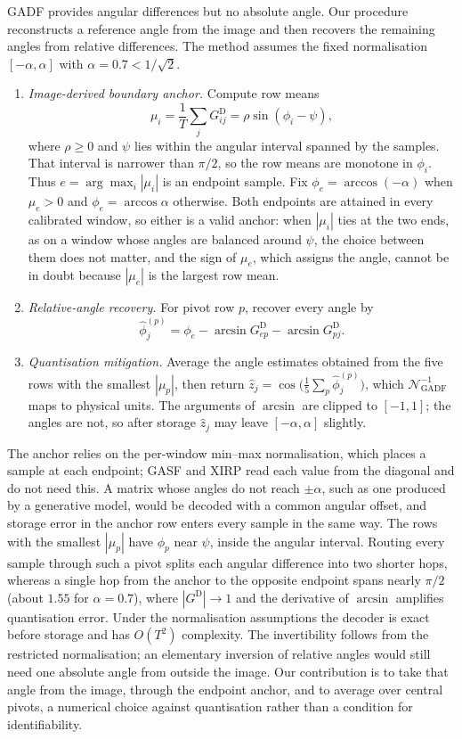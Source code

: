 \documentclass[preprint,review,12pt]{elsarticle}
\begin{document}
GADF provides angular differences but no absolute angle. Our procedure reconstructs a reference angle from the image and then recovers the remaining angles from relative differences. The method assumes the fixed normalisation $[-\alpha,\alpha]$ with $\alpha=0.7<1/\sqrt2$.
\begin{enumerate}
\item \emph{Image-derived boundary anchor.} Compute row means
\[
\mu_i=\frac1T\sum_jG^{\mathrm D}_{ij}=\rho\sin(\phi_i-\psi),
\]
where $\rho\ge0$ and $\psi$ lies within the angular interval spanned by the samples. That interval is narrower than $\pi/2$, so the row means are monotone in $\phi_i$. Thus $e=\arg\max_i|\mu_i|$ is an endpoint sample. Fix $\phi_e=\arccos(-\alpha)$ when $\mu_e>0$ and $\phi_e=\arccos\alpha$ otherwise. Both endpoints are attained in every calibrated window, so either is a valid anchor: when $|\mu_i|$ ties at the two ends, as on a window whose angles are balanced around $\psi$, the choice between them does not matter, and the sign of $\mu_e$, which assigns the angle, cannot be in doubt because $|\mu_e|$ is the largest row mean.
\item \emph{Relative-angle recovery.} For pivot row $p$, recover every angle by
\[
\hat\phi_j^{(p)}=\phi_e-\arcsin G^{\mathrm D}_{ep}-\arcsin G^{\mathrm D}_{pj}.
\]
\item \emph{Quantisation mitigation.} Average the angle estimates obtained from the five rows with the smallest $|\mu_p|$, then return $\hat z_j=\cos\!\bigl(\frac15\sum_p\hat\phi_j^{(p)}\bigr)$, which $\mathcal N_{\mathrm{GADF}}^{-1}$ maps to physical units. The arguments of $\arcsin$ are clipped to $[-1,1]$; the angles are not, so after storage $\hat z_j$ may leave $[-\alpha,\alpha]$ slightly.
\end{enumerate}
The anchor relies on the per-window min--max normalisation, which places a sample at each endpoint; GASF and XIRP read each value from the diagonal and do not need this. A matrix whose angles do not reach $\pm\alpha$, such as one produced by a generative model, would be decoded with a common angular offset, and storage error in the anchor row enters every sample in the same way.
The rows with the smallest $|\mu_p|$ have $\phi_p$ near $\psi$, inside the angular interval. Routing every sample through such a pivot splits each angular difference into two shorter hops, whereas a single hop from the anchor to the opposite endpoint spans nearly $\pi/2$ (about $1.55$ for $\alpha=0.7$), where $|G^{\mathrm D}|\to1$ and the derivative of $\arcsin$ amplifies quantisation error.
Under the normalisation assumptions the decoder is exact before storage and has $O(T^2)$ complexity. The invertibility follows from the restricted normalisation; an elementary inversion of relative angles would still need one absolute angle from outside the image. Our contribution is to take that angle from the image, through the endpoint anchor, and to average over central pivots, a numerical choice against quantisation rather than a condition for identifiability.
\end{document}
